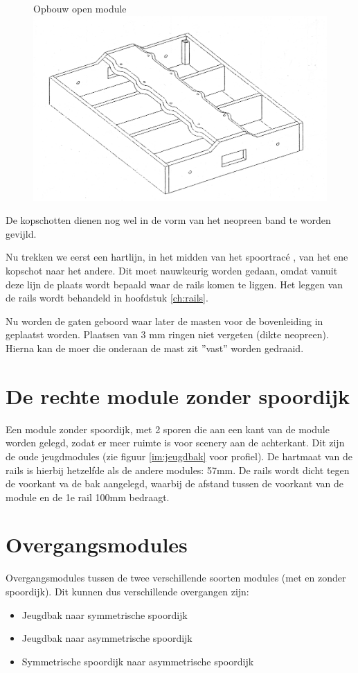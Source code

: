 \documentclass[12pt,a4paper]{report}
\newcommand*{\trace}{trac\'{e} }
\begin{document}
\begin{figure}[ht]
  \captionbox
  {Opbouw open module\label{figuur1}}
  {\includegraphics[scale=0.2]{images/rcu_figuur1}}
\end{figure}

De kopschotten dienen nog wel in de vorm van het neopreen band te worden gevijld. 

Nu trekken we eerst een hartlijn, in het midden van het spoor\trace, van het ene kopschot naar het andere. Dit moet nauwkeurig worden gedaan, omdat vanuit deze lijn de plaats wordt bepaald waar de rails komen te liggen.
Het leggen van de rails wordt behandeld in hoofdstuk \ref{ch:rails}.

Nu worden de gaten geboord waar later de masten voor de bovenleiding in geplaatst worden. 
Plaatsen van 3 mm ringen niet vergeten (dikte neopreen).
Hierna kan de moer die onderaan de mast zit ''vast'' worden gedraaid.

\section{De rechte module zonder spoordijk}
Een module zonder spoordijk, met 2 sporen die aan een kant van de module worden gelegd, zodat er meer ruimte is voor scenery aan de achterkant. Dit zijn de oude jeugdmodules (zie figuur \ref{im:jeugdbak} voor profiel).
De hartmaat van de rails is hierbij hetzelfde als de andere modules: 57mm. De rails wordt dicht tegen de voorkant va de bak aangelegd, waarbij de afstand tussen de voorkant van de module en de 1e rail 100mm bedraagt.

\section{Overgangsmodules}
Overgangsmodules tussen de twee verschillende soorten modules (met en zonder spoordijk). Dit kunnen dus verschillende overgangen zijn:
\begin{itemize}
\item Jeugdbak naar symmetrische spoordijk
\item Jeugdbak naar asymmetrische spoordijk
\item Symmetrische spoordijk naar asymmetrische spoordijk
\end{itemize}
\end{document}
